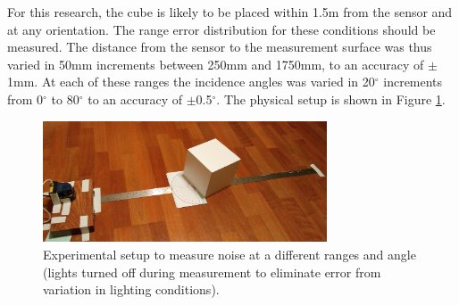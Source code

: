 	For this research, the cube is likely to be placed within 1.5m from the sensor and at any orientation. The range error distribution for these conditions should be measured. The distance from the sensor to the measurement surface was thus varied in 50mm increments between 250mm and 1750mm, to an accuracy of $\pm$1mm. At each of these ranges the incidence angles was varied in 20$^\circ$ increments from 0$^\circ$ to 80$^\circ$ to an accuracy of $\pm$0.5$^\circ$. The physical setup is shown in Figure \ref{fig:noise_setup}.
	
	\begin{figure}
	\centering
	 	\includegraphics[width=0.75\textwidth,trim = 0mm 0mm 0mm 0mm,clip=true]{./Figures/noise_setup}\vspace*{0ex}
	  	\caption{Experimental setup to measure noise at a different ranges and angle (lights turned off during measurement to eliminate error from variation in lighting conditions).} \label{fig:noise_setup}
	\end{figure}
		 
